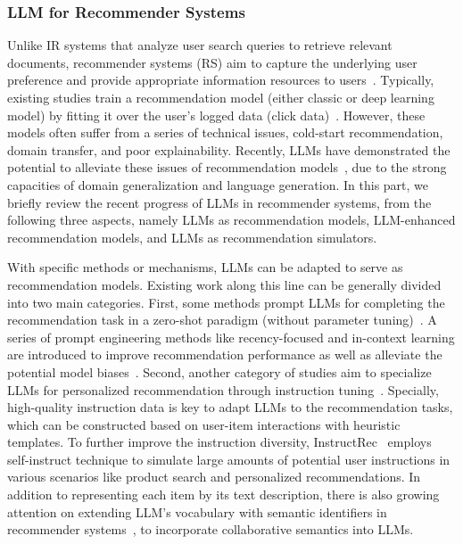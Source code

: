 \subsubsection{LLM for Recommender Systems} 
{
Unlike IR systems that analyze user search queries to retrieve relevant documents, recommender systems (RS) aim to capture the underlying user preference and provide appropriate information resources to users~\cite{zhao-cikm-2021-recbole, zhou-cikm-2021-s3rec, Zhao-cikm-2022-recbole-2, Xu-sigir-2023-towards}. 
Typically, existing studies train a recommendation model (either classic or deep learning model) by fitting it over the user's logged data (\eg click data)~\cite{Rendle-arxiv-2012-bpr, Kang-ICDM-2018-Self}.  
However, these models often suffer from a series of technical issues, \eg cold-start recommendation, domain transfer, and poor explainability. 
Recently, LLMs have demonstrated the potential to alleviate these issues of recommendation models~\cite{Zhang-2023-arxiv-recommendation, fan-arxiv-2023-recommender, wu-arixv-2023-a}, due to the strong  capacities of domain generalization and language generation.   
In this part, we briefly
review the recent progress of LLMs in recommender systems, from the following three aspects, namely LLMs as recommendation models, LLM-enhanced recommendation models, and LLMs as recommendation simulators. 
}



{
 With specific methods or mechanisms, LLMs can be adapted to serve as recommendation models.  
Existing work along this line can be generally divided into two main categories. First, some methods prompt LLMs for completing the recommendation task in a zero-shot paradigm (\ie without parameter tuning)~\cite{Gao-arxiv-2023-chat-rec, dai-recsys-2023-uncovering}. A series of prompt engineering methods like recency-focused and in-context learning are introduced to improve recommendation performance as well as alleviate the potential model biases~\cite{hou-arxiv-2023-large, Liu-arxiv-2023-is}.
Second, another category  of studies aim to specialize LLMs for personalized recommendation through instruction tuning~\cite{Zhang-2023-arxiv-recommendation,bao-recsys-2023-tallrec}. Specially, high-quality  instruction data is key to adapt LLMs to the recommendation tasks, which can be constructed based on user-item interactions with heuristic templates. To further improve the instruction diversity, 
InstructRec~\cite{Zhang-2023-arxiv-recommendation} employs self-instruct technique to simulate large amounts of potential user instructions in various scenarios like product search and personalized recommendations. In addition to representing each item by its text description, there is also growing attention on extending LLM's vocabulary  with semantic identifiers in recommender systems~\cite{Zhu-arxiv-2023-Collaborative,Zheng-2023-arxiv-Adapting}, to incorporate collaborative semantics into LLMs.}





